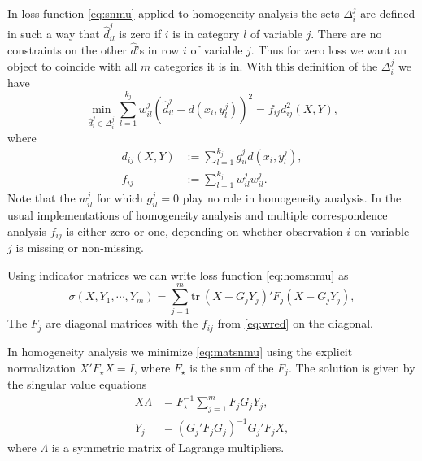 \documentclass[
  12pt,
]{article}
\begin{document}
In loss function \eqref{eq:snmu} applied to homogeneity analysis
the sets \(\Delta_i^j\) are defined in such a way that \(\hat d_{il}^j\) is zero if \(i\) is in category \(l\) of
variable \(j\). There are no constraints on the other \(\hat d\)'s in row \(i\)
of variable \(j\). Thus for zero loss we want an object to coincide with all \(m\) categories it is in. With this definition of the \(\Delta_i^j\) we have
\begin{equation}
\min_{\hat d_i^j\in\Delta_i^j}\sum_{l=1}^{k_j}w_{il}^j(\hat d_{il}^j-d(x_i,y_l^j))^2=f_{ij}d_{ij}^2(X,Y),
\label{eq:homsnmu}
\end{equation}
where
\begin{subequations}
\begin{align}
d_{ij}(X,Y)&:=\sum_{l=1}^{k_j}g_{il}^jd(x_i,y^j_l),\label{eq:dred}\\
f_{ij}&:=\sum_{l=1}^{k_j}w^j_{il}w^j_{il}.\label{eq:wred}
\end{align}
\end{subequations}
Note that the \(w^j_{il}\) for which \(g^j_{il}=0\) play no role in
homogeneity analysis. In the usual implementations of homogeneity
analysis and multiple correspondence analysis
\(f_{ij}\) is either zero or one, depending on whether observation
\(i\) on variable \(j\) is missing or non-missing.

Using indicator matrices we can write loss function \eqref{eq:homsnmu} as
\begin{equation}
\sigma(X,Y_1,\cdots,Y_m)=
\sum_{j=1}^m\text{tr}\ (X-G_jY_j)'F_j(X-G_jY_j),
\label{eq:matsnmu}
\end{equation}
The \(F_j\) are diagonal matrices with the \(f_{ij}\) from \eqref{eq:wred}
on the diagonal.

In homogeneity analysis we minimize \eqref{eq:matsnmu} using the
explicit normalization \(X'F_\star X=I\), where \(F_\star\) is the
sum of the \(F_j\). The solution is given by the singular value
equations
\begin{subequations}
\begin{align}
X\Lambda&=F_\star^{-1}\sum_{j=1}^m F_jG_jY_j,\label{eq:homsvd1}\\
Y_j&=(G_j'F_jG_j)^{-1}G_j'F_jX,\label{eq:homsvd2}
\end{align}
\end{subequations}
where \(\Lambda\) is a symmetric matrix of Lagrange multipliers.
\end{document}
